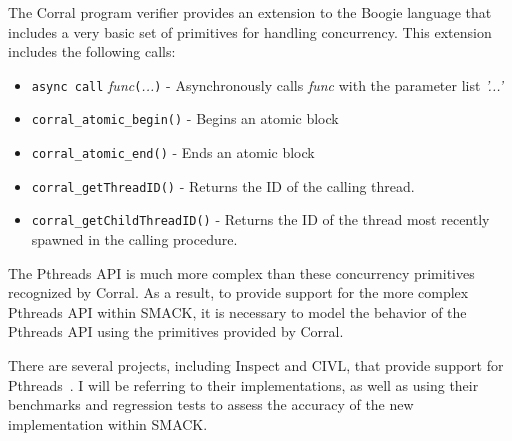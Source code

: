 \message{ !name(thesis.tex)}\documentclass[11pt,Chicago]{uuthesis}
\begin{document}
The Corral program verifier provides an extension to the Boogie language that includes a very basic set of primitives for handling concurrency.  This extension includes the following calls:
\begin{itemize}
\item \lstinline|async call| \emph{func}\lstinline|(|\emph{...}\lstinline|)| - Asynchronously calls \emph{func} with the parameter list \emph{'...'}
\item \lstinline|corral_atomic_begin()| - Begins an atomic block
\item \lstinline|corral_atomic_end()| - Ends an atomic block
\item \lstinline|corral_getThreadID()| - Returns the ID of the calling thread.
\item \lstinline|corral_getChildThreadID()| - Returns the ID of the thread most recently spawned in the calling procedure.
\end{itemize}
The Pthreads API is much more complex than these concurrency primitives recognized by Corral.  As a result, to provide support for the more complex Pthreads API within SMACK, it is necessary to model the behavior of the Pthreads API using the primitives provided by Corral.

There are several projects, including Inspect and CIVL, that provide support for Pthreads~\cite{civl}\cite{inspect}.  I will be referring to their implementations, as well as using their benchmarks and regression tests to assess the accuracy of the new implementation within SMACK.

\end{document}
